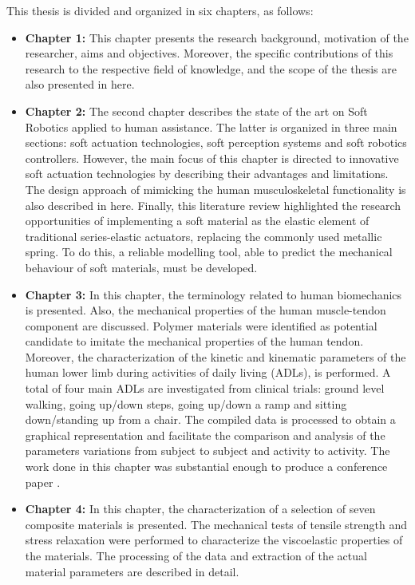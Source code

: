 This thesis is divided and organized in six chapters, as follows:
\begin{itemize}
    \item {\bf Chapter 1: } This chapter presents the research background, motivation of the researcher, aims and objectives. Moreover, the specific contributions of this research to the respective field of knowledge, and the scope of the thesis are also presented in here.
    \item {\bf Chapter 2:} The second chapter describes the state of the art on Soft Robotics applied to human assistance. The latter is organized in three main sections: soft actuation technologies, soft perception systems and soft robotics controllers. However, the main focus of this chapter is directed to innovative soft actuation technologies by describing their advantages and limitations. The design approach of mimicking the human musculoskeletal functionality is also described in here.  Finally, this literature review highlighted the research opportunities of implementing a soft material as the elastic element of traditional series-elastic actuators, replacing the commonly used metallic spring. To do this, a reliable modelling tool, able to predict the mechanical behaviour of soft materials, must be developed.
    \item {\bf Chapter 3:} In this chapter, the terminology related to human biomechanics is presented. Also, the mechanical properties of the human muscle-tendon component are discussed. Polymer materials were identified as potential candidate to imitate the mechanical properties of the human tendon. Moreover, the characterization of the kinetic and kinematic parameters of the human lower limb during activities of daily living (ADLs), is performed. A total of four main ADLs are investigated from clinical trials: ground level walking, going up/down steps, going up/down a ramp and sitting down/standing up from a chair. The compiled data is processed to obtain a graphical representation and facilitate the comparison and analysis of the parameters variations from subject to subject and activity to activity. The work done in this chapter was substantial enough to produce a conference paper \cite{solis2017characterization}.
    \item {\bf Chapter 4: } In this chapter, the characterization of a selection of seven composite materials is presented. The mechanical tests of tensile strength and stress relaxation were performed to characterize the viscoelastic properties of the materials. The processing of the data and extraction of the actual material parameters are described in detail.

\end{itemize}
